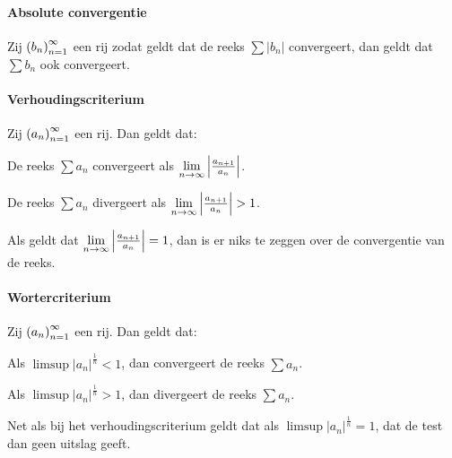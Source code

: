 \paragraph{Absolute convergentie} Zij \(\left(b_{n}\right)_{n=1}^{\infty}\) een rij zodat geldt dat de reeks \(\sum|b_{n}|\) convergeert, dan geldt dat \(\sum b_{n}\) ook convergeert.

\paragraph{Verhoudingscriterium} Zij \(\left(a_{n}\right)_{n=1}^{\infty}\) een rij. Dan geldt dat:
\begin{enum}[i.]
    \item De reeks \(\sum a_{n}\) convergeert als \(\underset{n\to\infty}{\text{lim}}\left|\frac{a_{n+1}}{a_{n}}\right|\).
    \item De reeks \(\sum a_{n}\) divergeert als \(\liminfty{n}\left|\frac{a_{n+1}}{a_{n}}\right|>1\).
    \item Als geldt dat \(\underset{n\to\infty}{\text{lim}}\left|\frac{a_{n+1}}{a_{n}}\right|=1\), dan is er niks te zeggen over de convergentie van de reeks.
\end{enum}

\paragraph{Wortercriterium} Zij \(\left(a_{n}\right)_{n=1}^{\infty}\) een rij. Dan geldt dat:
\begin{enum}[i.]
    \item Als \(\limsup\left|a_{n}\right|^{\frac{1}{n}}<1\), dan convergeert de reeks \(\sum a_{n}\).
    \item Als \(\limsup\left|a_{n}\right|^{\frac{1}{n}}>1\), dan divergeert de reeks \(\sum a_{n}\).
    \item Net als bij het verhoudingscriterium geldt dat als \(\limsup\left|a_{n}\right|^{\frac{1}{n}}=1\), dat de test dan geen uitslag geeft.
\end{enum}